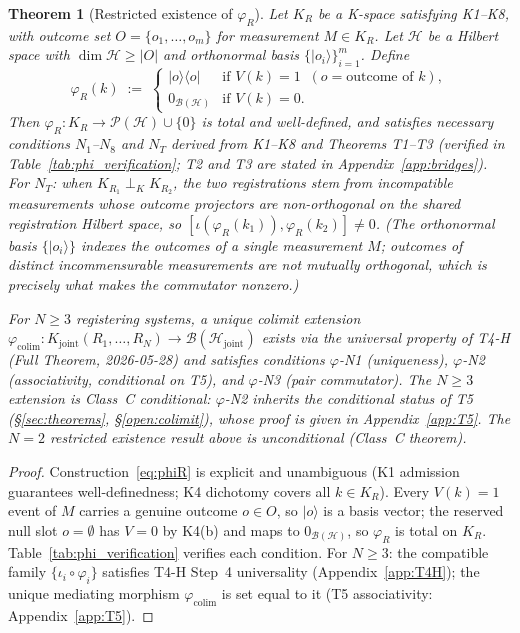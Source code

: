 \documentclass[12pt,a4paper]{article}
\theoremstyle{plain}
\newtheorem{theorem}{Theorem}[section]
\theoremstyle{definition}
\theoremstyle{remark}
\newcommand{\Kjoint}{K_{\mathrm{joint}}}
\begin{document}

\begin{theorem}[Restricted existence of $\varphi_R$]\label{thm:phiR}
Let $K_R$ be a K-space satisfying K1--K8, with outcome set
$O = \{o_1,\ldots,o_m\}$ for measurement $M \in K_R$.
Let $\mathcal{H}$ be a Hilbert space with $\dim\mathcal{H} \ge |O|$ and
orthonormal basis $\{|o_i\rangle\}_{i=1}^{m}$.
Define
\begin{equation}
  \varphi_R(k) \;:=\;
  \begin{cases}
    |o\rangle\langle o| & \text{if } V(k) = 1 \;\; (o = \text{outcome of }k),\\
    0_{\mathcal{B}(\mathcal{H})} & \text{if } V(k) = 0.
  \end{cases}
  \label{eq:phiR}
\end{equation}
Then $\varphi_R \colon K_R \to \mathcal{P}(\mathcal{H})\cup\{0\}$ is total
and well-defined, and satisfies necessary conditions $N_1$--$N_8$ and $N_T$
derived from K1--K8 and Theorems T1--T3 (verified in
Table~\ref{tab:phi_verification}; T2 and T3 are stated in
Appendix~\ref{app:bridges}). For $N_T$: when $K_{R_1}\perp_K K_{R_2}$, the two
registrations stem from \emph{incompatible} measurements whose outcome
projectors are non-orthogonal on the shared registration Hilbert space, so
$[\iota(\varphi_R(k_1)),\varphi_R(k_2)]\ne 0$. (The orthonormal basis
$\{|o_i\rangle\}$ indexes the outcomes of a \emph{single} measurement $M$;
outcomes of distinct incommensurable measurements are not mutually orthogonal,
which is precisely what makes the commutator nonzero.)

For $N \ge 3$ registering systems, a unique colimit extension
$\varphi_{\mathrm{colim}}\colon \Kjoint(R_1,\ldots,R_N) \to
\mathcal{B}(\mathcal{H}_{\mathrm{joint}})$
exists via the universal property of T4-H (Full Theorem, 2026-05-28)
and satisfies conditions $\varphi$-N1 (uniqueness), $\varphi$-N2
(associativity, conditional on T5), and $\varphi$-N3 (pair commutator).
The $N \ge 3$ extension is \emph{Class~C conditional}: $\varphi$-N2 inherits
the conditional status of T5 (\S\ref{sec:theorems}, \S\ref{open:colimit}),
whose proof is given in Appendix~\ref{app:T5}. The $N = 2$ restricted
existence result above is unconditional (Class~C theorem).
\end{theorem}

\begin{proof}
Construction~\eqref{eq:phiR} is explicit and unambiguous (K1 admission
guarantees well-definedness; K4 dichotomy covers all $k \in K_R$). Every
$V(k)=1$ event of $M$ carries a genuine outcome $o\in O$, so $|o\rangle$ is a
basis vector; the reserved null slot $o=\emptyset$ has $V=0$ by K4(b) and maps
to $0_{\mathcal{B}(\mathcal{H})}$, so $\varphi_R$ is total on $K_R$.
Table~\ref{tab:phi_verification} verifies each condition.
For $N \ge 3$: the compatible family $\{\iota_i \circ \varphi_i\}$ satisfies
T4-H Step~4 universality (Appendix~\ref{app:T4H}); the unique mediating
morphism $\varphi_{\mathrm{colim}}$ is set equal to it (T5 associativity:
Appendix~\ref{app:T5}).
\end{proof}
\end{document}
